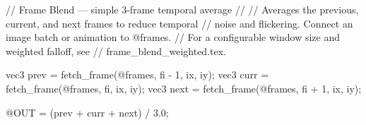 // Frame Blend — simple 3-frame temporal average
//
// Averages the previous, current, and next frames to reduce temporal
// noise and flickering. Connect an image batch or animation to @frames.
// For a configurable window size and weighted falloff, see
// frame_blend_weighted.tex.

vec3 prev = fetch_frame(@frames, fi - 1, ix, iy);
vec3 curr = fetch_frame(@frames, fi, ix, iy);
vec3 next = fetch_frame(@frames, fi + 1, ix, iy);

@OUT = (prev + curr + next) / 3.0;